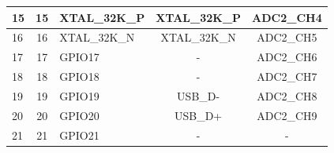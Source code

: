 \begin{longtable}[c]{|p{2.3cm}|c|p{2.5cm}|c|c| }
\hline
15 & 15 &  XTAL\_32K\_P & XTAL\_32K\_P           & ADC2\_CH4              \\
\hline
16 & 16 & XTAL\_32K\_N & XTAL\_32K\_N           &  ADC2\_CH5              \\
\hline
17 & 17 & GPIO17 & -           & ADC2\_CH6              \\
\hline
18 & 18 & GPIO18 & -           & ADC2\_CH7              \\
\hline
19 & 19 & GPIO19 & USB\_D-           & ADC2\_CH8              \\
\hline
20 & 20 & GPIO20 & USB\_D+           &  ADC2\_CH9             \\
\hline
21 & 21 & GPIO21 & -           &  -             \\
\hline

\end{longtable}
